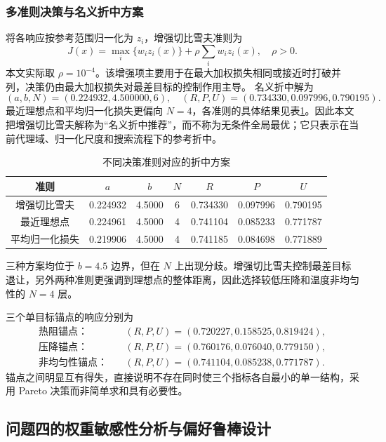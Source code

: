 \documentclass[12pt,a4paper]{article}
\begin{document}
\subsubsection{多准则决策与名义折中方案}
将各响应按参考范围归一化为 $z_i$，增强切比雪夫准则为
\begin{equation}J(x)=\max_i\{w_i z_i(x)\}+\rho\sum_iw_i z_i(x),\quad\rho>0.\end{equation}
本文实际取 $\rho=10^{-4}$。该增强项主要用于在最大加权损失相同或接近时打破并列，决策仍由最大加权损失对最差目标的控制作用主导。
名义折中解为
\begin{equation}(a,b,N)=(0.224932,4.500000,6),\quad(R,P,U)=(0.734330,0.097996,0.790195).\end{equation}
最近理想点和平均归一化损失更偏向 $N=4$，各准则的具体结果见表\ref{tab:q3-compromises}。因此本文把增强切比雪夫解称为“名义折中推荐”，而不称为无条件全局最优；它只表示在当前代理域、归一化尺度和搜索流程下的参考折中。

\begin{table}[H]\centering\small\caption{不同决策准则对应的折中方案}\label{tab:q3-compromises}
\begin{tabular}{ccccccc}\toprule
准则&$a$&$b$&$N$&$R$&$P$&$U$\\\midrule
增强切比雪夫&0.224932&4.5000&6&0.734330&0.097996&0.790195\\
最近理想点&0.224961&4.5000&4&0.741104&0.085233&0.771787\\
平均归一化损失&0.219906&4.5000&4&0.741185&0.084698&0.771889\\\bottomrule
\end{tabular}\end{table}
三种方案均位于 $b=4.5$ 边界，但在 $N$ 上出现分歧。增强切比雪夫控制最差目标退让，另外两种准则更强调到理想点的整体距离，因此选择较低压降和温度非均匀性的 $N=4$ 层。

三个单目标锚点的响应分别为
\[
\begin{aligned}
\text{热阻锚点：}&\quad(R,P,U)=(0.720227,0.158525,0.819424),\\
\text{压降锚点：}&\quad(R,P,U)=(0.760176,0.076040,0.779150),\\
\text{非均匀性锚点：}&\quad(R,P,U)=(0.741104,0.085238,0.771787).
\end{aligned}
\]
锚点之间明显互有得失，直接说明不存在同时使三个指标各自最小的单一结构，采用 Pareto 决策而非简单求和具有必要性。

\subsection{问题四的权重敏感性分析与偏好鲁棒设计}
\end{document}
